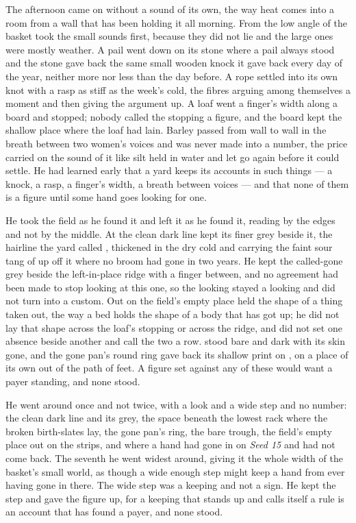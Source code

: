 The afternoon came on without a sound of its own, the way heat comes into a room from a wall that has been holding it all morning. From the low angle of the basket  took the small sounds first, because they did not lie and the large ones were mostly weather. A pail went down on its stone where a pail always stood and the stone gave back the same small wooden knock it gave back every day of the year, neither more nor less than the day before. A rope settled into its own knot with a rasp as stiff as the week's cold, the fibres arguing among themselves a moment and then giving the argument up. A loaf went a finger's width along a board and stopped; nobody called the stopping a figure, and the board kept the shallow place where the loaf had lain. Barley passed from wall to wall in the breath between two women's voices and was never made into a number, the price carried on the sound of it like silt held in water and let go again before it could settle. He had learned early that a yard keeps its accounts in such things --- a knock, a rasp, a finger's width, a breath between voices --- and that none of them is a figure until some hand goes looking for one.

He took the field as he found it and left it as he found it, reading by the edges and not by the middle. At  the clean dark line kept its finer grey beside it, the hairline the yard called , thickened in the dry cold and carrying the faint sour tang of  up off it where no broom had gone in two years. He kept the called-gone grey beside the left-in-place ridge with a finger between, and no agreement had been made to stop looking at this one, so the looking stayed a looking and did not turn into a custom. Out on  the field's empty place held the shape of a thing taken out, the way a bed holds the shape of a body that has got up; he did not lay that shape across the loaf's stopping or across the ridge, and did not set one absence beside another and call the two a row.  stood bare and dark with its skin gone, and the gone pan's round ring gave back its shallow print on , on a place of its own out of the path of feet. A figure set against any of these would want a payer standing, and none stood.

He went around  once and not twice, with a look and a wide step and no number: the clean dark line and its grey, the space beneath the lowest rack where the broken birth-slates lay, the gone pan's ring, the bare trough, the field's empty place out on the strips, and  where a hand had gone in on \emph{Seed 15} and had not come back. The seventh he went widest around, giving it the whole width of the basket's small world, as though a wide enough step might keep a hand from ever having gone in there. The wide step was a keeping and not a sign. He kept the step and gave the figure up, for a keeping that stands up and calls itself a rule is an account that has found a payer, and none stood.

